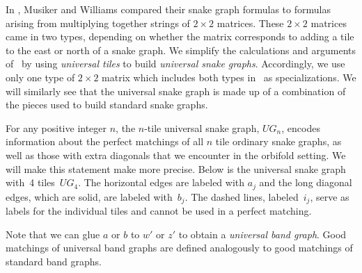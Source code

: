 In \cite{MW}, Musiker and Williams compared their snake graph formulas to formulas arising from multiplying together strings of $2 \times 2$ matrices. These $2 \times 2$ matrices came in two types, depending on whether the matrix corresponds to adding a tile to the east or north of a snake graph. We simplify the calculations and arguments of~\cite{MW} by using \emph{universal tiles} to build \emph{universal snake graphs}. Accordingly, we use only one type of $2 \times 2$ matrix which includes both types in~\cite{MW} as specializations. We will similarly see that the universal snake graph is made up of a combination of the pieces used to build standard snake graphs.

For any positive integer $n$, the $n$-tile universal snake graph, $UG_n$, encodes information about the perfect matchings of all $n$ tile ordinary snake graphs, as well as those with extra diagonals that we encounter in the orbifold setting. We will make this statement make more precise. Below is the universal snake graph with~4 tiles~$UG_4$. The horizontal edges are labeled with $a_j$ and the long diagonal edges, which are solid, are labeled with~$b_j$. The dashed lines, labeled~$i_j$, serve as labels for the individual tiles and cannot be used in a perfect mat\-ching.

\begin{center}
\end{center}

Note that we can glue $a$ or $b$ to $w'$ or $z'$ to obtain a \emph{universal band graph}. Good matchings of universal band graphs are defined analogously to good matchings of standard band graphs.

